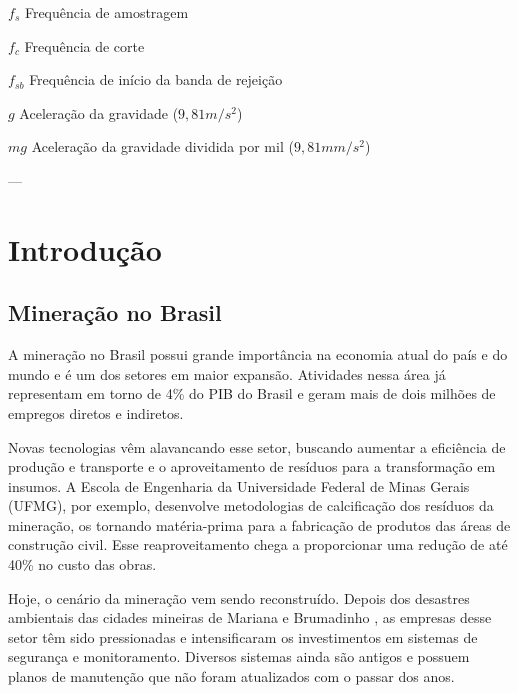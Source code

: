 \documentclass[
	12pt,				%
	openright,			%
	twoside,			%
	a4paper,			%
	english,			%
	french,				%
	spanish,			%
	brazil,				%
	]{abntex2}
\begin{document}
\begin{simbolos}
  \item[$ f_{s} $] Frequência de amostragem
  \item[$ f_{c} $] Frequência de corte
  \item[$ f_{sb} $] Frequência de início da banda de rejeição
  \item[$ g $] Aceleração da gravidade ($9,81m/s^2$)
  \item[$ mg $] Aceleração da gravidade dividida por mil ($9,81mm/s^2$)
\end{simbolos}
---

\tableofcontents*
\cleardoublepage

\textual


\chapter{Introdução}

	\section{Mineração no Brasil}

		A mineração no Brasil possui grande importância na economia atual do país e
		do mundo e é um dos setores em maior expansão. Atividades nessa área já
		representam em torno de 4\% do PIB do Brasil e geram mais de dois milhões de
		empregos diretos e indiretos.\cite{pib}

		Novas tecnologias vêm alavancando esse setor, buscando aumentar a eficiência
		de produção e transporte e o aproveitamento de resíduos para a
		transformação em insumos. A Escola de Engenharia da Universidade Federal de
		Minas Gerais (UFMG), por exemplo, desenvolve metodologias de calcificação
		dos resíduos da mineração, os tornando matéria-prima para a fabricação de
		produtos das áreas de construção civil. Esse reaproveitamento chega a
		proporcionar uma redução de até 40\% no custo das obras.\cite{mineracaoUFMG}

		Hoje, o cenário da mineração vem sendo reconstruído. Depois dos desastres ambientais das cidades mineiras de Mariana \cite{mariana} e Brumadinho \cite{brumadinho} , as empresas desse setor têm sido pressionadas e intensificaram os investimentos em sistemas de segurança e monitoramento. Diversos sistemas ainda são antigos e possuem planos de manutenção que não foram atualizados com o passar dos anos.
		
\end{document}
